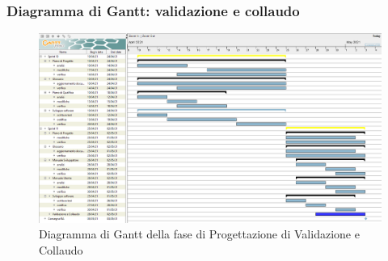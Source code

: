 \subsubsection{Diagramma di Gantt: validazione e collaudo}
\begin{figure}[H]
    \centering
    \includegraphics[scale = 0.25]{components/img/validazione_collaudo.png}
    \caption{Diagramma di Gantt della fase di Progettazione di Validazione e Collaudo}
    \label{fig:Diagramma di Gantt, fase di Validazione e collaudo}
\end{figure}
